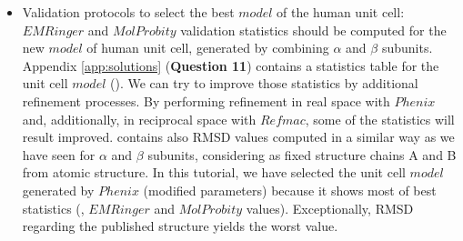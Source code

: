 \begin{itemize}
 \item Validation protocols to select the best $model$ of the human  unit cell:\\
 
 $EMRinger$ and $MolProbity$ validation statistics should be computed for the new $model$ of human  unit cell, generated by combining  $\alpha$ and $\beta$ subunits. Appendix \ref{app:solutions} (\textbf{Question 11}) contains a statistics table for the unit cell $model$ (). We can try to improve those statistics by additional refinement processes. By performing refinement in real space with $Phenix$ and, additionally, in reciprocal space with $Refmac$, some of the statistics will result improved.  contains also RMSD values computed in a similar way as we have seen for $\alpha$ and $\beta$ subunits, considering as fixed structure chains A and B from  atomic structure. In this tutorial, we have selected the unit cell $model$ generated by $Phenix$  (modified parameters) because it shows most of best statistics (\ccmask, $EMRinger$  and $MolProbity$ values). Exceptionally, RMSD regarding the published structure yields the worst value.
 
\end{itemize}

